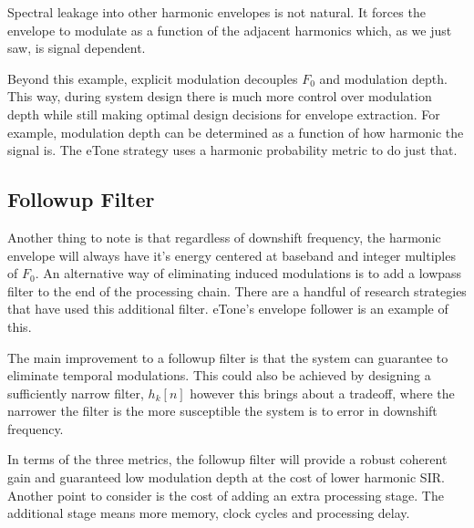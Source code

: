 \documentclass [11pt, proquest,oneside] {ganter_thesis}[2015/03/03]
\begin{document}
Spectral leakage into other harmonic envelopes is not natural.  It forces the envelope to modulate as a function of the adjacent harmonics which, as we just saw, is signal dependent.

Beyond this example, explicit modulation decouples $F_0$ and modulation depth.  This way, during system design there is much more control over modulation depth while still making optimal design decisions for envelope extraction.  For example, modulation depth can be determined as a function of how harmonic the signal is.  The eTone strategy \cite{vandali2011development} uses a harmonic probability metric to do just that.

\subsection{Followup Filter}

Another thing to note is that regardless of downshift frequency, the harmonic envelope will always have it's energy centered at baseband and integer multiples of $F_0$.  An alternative way of eliminating induced modulations is to add a lowpass filter to the end of the processing chain.  There are a handful of research strategies that have used this additional filter.  eTone's envelope follower is an example of this.

The main improvement to a followup filter is that the system can guarantee to eliminate temporal modulations.  This could also be achieved by designing a sufficiently narrow filter, $h_k[n]$ however this brings about a tradeoff, where the narrower the filter is the more susceptible the system is to error in downshift frequency.

In terms of the three metrics, the followup filter will provide a robust coherent gain and guaranteed low modulation depth at the cost of lower harmonic SIR.  Another point to consider is the cost of adding an extra processing stage.  The additional stage means more memory, clock cycles and processing delay.

\end{document}
